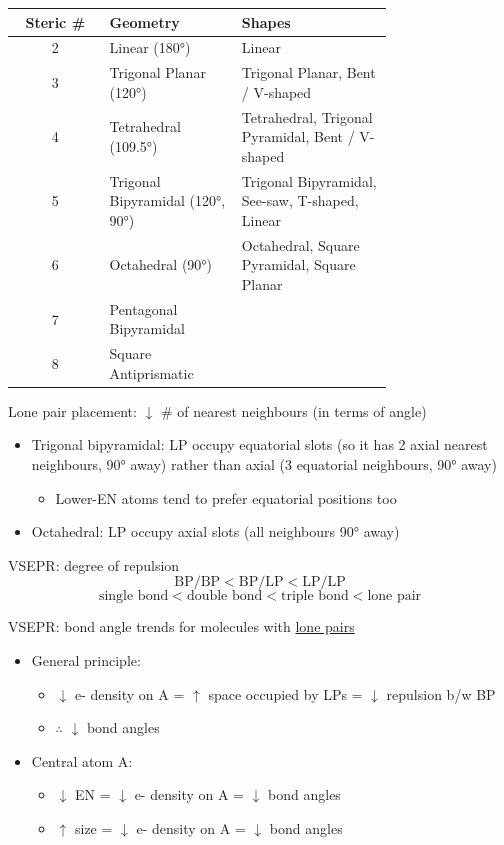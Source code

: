 \documentclass[10pt,landscape]{article}
\newcommand{\extraline}{\vspace{1em}}
\begin{document}
\begin{multicols}{3}
\begin{tabular}{@{}cp{0.35\linewidth}<{\raggedright}p{0.4\linewidth}<{\raggedright}@{}}
Steric \# & Geometry & Shapes \\ \hline
2 & Linear (180°) 
	& Linear \\
3 & Trigonal Planar (120°)
	& Trigonal Planar, Bent / V-shaped \\
4 & Tetrahedral (109.5°)
	& Tetrahedral, Trigonal Pyramidal, Bent / V-shaped  \\
5 & Trigonal Bipyramidal (120°, 90°)
	& Trigonal Bipyramidal, See-saw, T-shaped, Linear  \\
6 & Octahedral (90°)
	& Octahedral, Square Pyramidal, Square Planar \\
7 & Pentagonal Bipyramidal & \\ %
8 & Square Antiprismatic & \\ %
\end{tabular}
\extraline

Lone pair placement:  $\downarrow$ \# of nearest neighbours (in terms of angle)
\begin{itemize}
	\item Trigonal bipyramidal: LP occupy equatorial slots (so it has 2 axial nearest neighbours, 90° away) rather than axial (3 equatorial neighbours, 90° away)
	\begin{itemize}	
		\item Lower-EN atoms tend to prefer equatorial positions too
	\end{itemize}
	\item Octahedral: LP occupy axial slots (all neighbours 90° away)
\end{itemize}


VSEPR: degree of repulsion
\[ \text{BP/BP} < \text{BP/LP} < \text{LP/LP} \]
\[ \text{single bond} < \text{double bond} < \text{triple bond} < \text{lone pair} \]

VSEPR: bond angle trends for molecules with \underline{lone pairs}
\begin{itemize}
\item General principle: 
	\begin{itemize}
		\item  $\downarrow$ e- density on A = $\uparrow$ space occupied by LPs = $\downarrow$ repulsion b/w BP 
		\item $\therefore$ $\downarrow$ bond angles
	\end{itemize}

\item Central atom A: 
	\begin{itemize}
		\item $\downarrow$ EN  = $\downarrow$ e- density on A = $\downarrow$ bond angles
		\item $\uparrow$ size =  $\downarrow$ e- density on A = $\downarrow$ bond angles
	\end{itemize}


\end{itemize}
\end{multicols}
\end{document}

